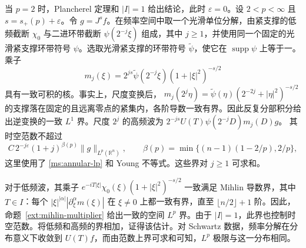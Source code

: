 当 \(p=2\) 时，Plancherel 定理和 \(|I|=1\) 给出结论，此时 \(\varepsilon=0\)。设 \(2<p<\infty\) 且 \(s=s_+(p)+\varepsilon\)。令 \(g=J^s f\)。在频率空间中取一个光滑单位分解，由紧支撑的低频截断 \(\chi_0\) 与二进环带截断 \(\psi(2^{-j}\xi)\) 组成，其中 \(j\ge1\)，并使用同一个固定的光滑紧支撑环带符号 \(\psi\)。选取光滑紧支撑的环带符号 \(\widetilde\psi\)，使它在 \(\operatorname{supp}\psi\) 上等于一。
乘子
\[
 m_j(\xi)=2^{js}\widetilde\psi(2^{-j}\xi)(1+|\xi|^2)^{-s/2}
\]
具有一致可积的核。事实上，尺度变换后，
\(m_j(2^j\eta)=\widetilde\psi(\eta)(2^{-2j}+|\eta|^2)^{-s/2}\)
的支撑落在固定的且远离零点的紧集内，各阶导数一致有界。因此反复分部积分给出逆变换的一致 \(L^1\) 界。尺度 \(2^j\) 的高频波为 \(2^{-js}U(T)\psi(2^{-j}D)m_j(D)g\)。
其时空范数不超过
\[
 C\,2^{-j\varepsilon}(1+j)^{\beta(p)}\|g\|_{L^p(\mathbb R^n)},
 \qquad
 \beta(p)=\min\{(n-1)(1-2/p),2/p\},
\]
这里使用了 \ref{ms:annular-lp} 和 Young 不等式。这些界对 \(j\ge1\) 可求和。

对于低频波，其乘子
\(e^{-iT|\xi|}\chi_0(\xi)(1+|\xi|^2)^{-s/2}\)
一致满足 Mihlin 导数界，其中 \(T\in I\)：每个 \(|\xi|^{|\alpha|}|\partial_\xi^\alpha m(\xi)|\) 在 \(\xi\ne0\) 上都一致有界，直至 \(\lfloor n/2\rfloor+1\) 阶。因此，命题~\ref{ext:mihlin-multiplier} 给出一致的空间 \(L^p\) 界。由于 \(|I|=1\)，此界也控制时空范数。将低频和高频的界相加，证得该估计。对 Schwartz 数据，频率分解在分布意义下收敛到 \(U(T)f\)，而由范数上界可求和可知，\(L^p\) 极限与这一分布相同。
